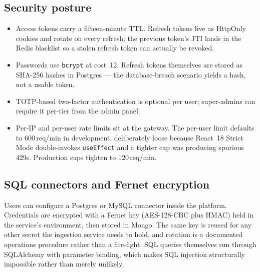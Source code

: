 \documentclass[12pt, a4paper, oneside]{report}
\begin{document}
\subsection{Security posture}

\begin{itemize}
    \item Access tokens carry a fifteen-minute TTL. Refresh tokens
        live as HttpOnly cookies and rotate on every refresh; the
        previous token's JTI lands in the Redis blacklist so a
        stolen refresh token can actually be revoked.
    \item Passwords use \texttt{bcrypt} at cost~12. Refresh tokens
        themselves are stored as SHA-256 hashes in Postgres --- the
        database-breach scenario yields a hash, not a usable token.
    \item TOTP-based two-factor authentication is optional per user;
        super-admins can require it per-tier from the admin panel.
    \item Per-IP and per-user rate limits sit at the gateway. The
        per-user limit defaults to $600$\,req/min in development,
        deliberately loose because React~18 Strict Mode
        double-invokes \texttt{useEffect} and a tighter cap was
        producing spurious 429s. Production caps tighten to
        $120$\,req/min.
\end{itemize}

\subsection{SQL connectors and Fernet encryption}

Users can configure a Postgres or MySQL connector inside the
platform. Credentials are encrypted with a Fernet key
(AES-128-CBC plus HMAC) held in the service's environment, then
stored in Mongo. The same key is reused for any other secret the
ingestion service needs to hold, and rotation is a documented
operations procedure rather than a fire-fight. SQL queries themselves
run through SQLAlchemy with parameter binding, which makes SQL
injection structurally impossible rather than merely unlikely.

\end{document}
